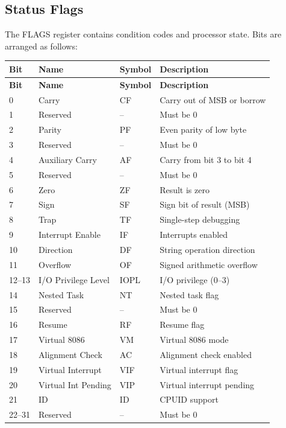 \documentclass[12pt]{article}
\begin{document}
\subsection{Status Flags}

The FLAGS register contains condition codes and processor state. Bits are arranged as follows:

\begin{longtable}{@{}llll@{}}
\toprule
\textbf{Bit} & \textbf{Name} & \textbf{Symbol} & \textbf{Description} \\ \midrule
\endfirsthead
\toprule
\textbf{Bit} & \textbf{Name} & \textbf{Symbol} & \textbf{Description} \\ \midrule
\endhead
0 & Carry & CF & Carry out of MSB or borrow \\
1 & Reserved & -- & Must be 0 \\
2 & Parity & PF & Even parity of low byte \\
3 & Reserved & -- & Must be 0 \\
4 & Auxiliary Carry & AF & Carry from bit 3 to bit 4 \\
5 & Reserved & -- & Must be 0 \\
6 & Zero & ZF & Result is zero \\
7 & Sign & SF & Sign bit of result (MSB) \\
8 & Trap & TF & Single-step debugging \\
9 & Interrupt Enable & IF & Interrupts enabled \\
10 & Direction & DF & String operation direction \\
11 & Overflow & OF & Signed arithmetic overflow \\
12--13 & I/O Privilege Level & IOPL & I/O privilege (0--3) \\
14 & Nested Task & NT & Nested task flag \\
15 & Reserved & -- & Must be 0 \\
16 & Resume & RF & Resume flag \\
17 & Virtual 8086 & VM & Virtual 8086 mode \\
18 & Alignment Check & AC & Alignment check enabled \\
19 & Virtual Interrupt & VIF & Virtual interrupt flag \\
20 & Virtual Int Pending & VIP & Virtual interrupt pending \\
21 & ID & ID & CPUID support \\
22--31 & Reserved & -- & Must be 0 \\ \bottomrule
\end{longtable}
\end{document}
